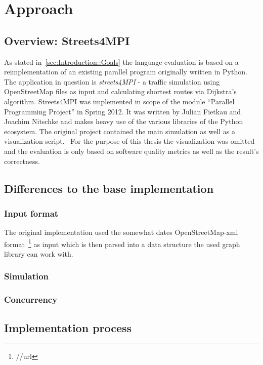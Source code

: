 \chapter{Approach}
\label{chap:Approach}


\section{Overview: Streets4MPI}
\label{sec:Approach::Overview}

As stated in~\autoref{sec:Introduction::Goals} the language evaluation is based on a reimplementation of an existing parallel program originally written in Python. The application in question is \textit{streets4MPI} - a traffic simulation using OpenStreetMap files as input and calculating shortest routes via Dijkstra's algorithm. Streets4MPI was implemented in scope of the module ``Parallel Programming Project'' in Spring 2012. It was written by Julian Fietkau and Joachim Nitschke and makes heavy use of the various libraries of the Python ecosystem. The original project contained the main simulation as well as a visualization script.~\cite{streets_report} For the purpose of this thesis the visualization was omitted and the evaluation is only based on software quality metrics as well as the result's correctness.

\section{Differences to the base implementation}
\label{sec:Approach::Differences}

\subsection*{Input format}
\label{subsec:Approach::Overview::Input}

The original implementation used the somewhat dates OpenStreetMap-xml format~\footnote{//url} as input which is then parsed into a data structure the used graph library can work with.

\subsection*{Simulation}
\label{subsec:Approach::Overview::Simulation}

\subsection*{Concurrency}
\label{subsec:Approach::Overview::Concurrency}


\section{Implementation process}
\label{sec:Approach::Implementation}
